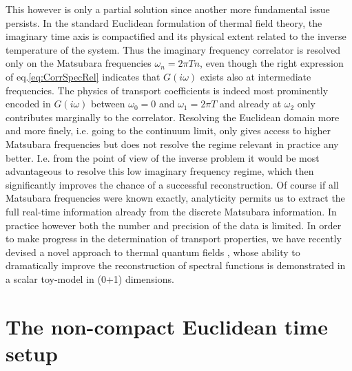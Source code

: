 \documentclass[epj]{webofc}
\begin{document}
This however is only a partial solution since another more fundamental issue persists. In the standard Euclidean formulation of thermal field theory, the imaginary time axis is compactified and its physical extent related to the inverse temperature of the system. Thus the imaginary frequency correlator is resolved only on the Matsubara frequencies $\omega_n=2\pi T n$, even though the right expression of eq.\eqref{eq:CorrSpecRel} indicates that $G(i\omega)$ exists also at intermediate frequencies. The physics of transport coefficients is indeed most prominently encoded in $G(i\omega)$ between $\omega_0=0$ and $\omega_1=2\pi T$ and already at $\omega_2$ only contributes marginally to the correlator. Resolving the Euclidean domain more and more finely, i.e. going to the continuum limit, only gives access to higher Matsubara frequencies but does not resolve the regime relevant in practice any better. I.e. from the point of view of the inverse problem it would be most advantageous to resolve this low imaginary frequency regime, which then significantly improves the chance of a successful reconstruction. Of course if all Matsubara frequencies were known exactly, analyticity permits us to extract the full real-time information already from the discrete Matsubara information. In practice however both the number and precision of the data is limited. In order to make progress in the determination of transport properties, we have recently devised a novel approach to thermal quantum fields \cite{Pawlowski:2016eck}, whose ability to dramatically improve the reconstruction of spectral functions is demonstrated in a scalar toy-model in (0+1) dimensions.
\section{The non-compact Euclidean time setup}\label{sec-1}
\end{document}
